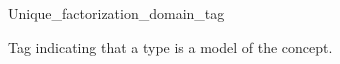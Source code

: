 \begin{ccRefClass}{Unique_factorization_domain_tag}
\label{Unique_factorization_domain_tag}

\ccDefinition
Tag indicating that a type is a model of the  concept. 


\ccInheritsFrom
{}

\ccIsModel
{}

\ccSeeAlso
{} \\
\\
\end{ccRefClass} 